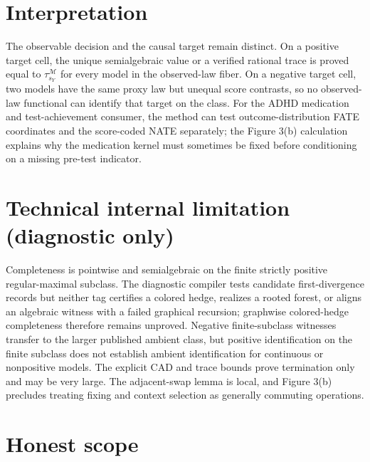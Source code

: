 \documentclass{article}
\begin{document}
\section{Interpretation}

The observable decision and the causal target remain distinct. On a positive target cell, the unique semialgebraic value or a verified rational trace is proved equal to \(\tau_{s_Y}^{\mathcal M}\) for every model in the observed-law fiber. On a negative target cell, two models have the same proxy law but unequal score contrasts, so no observed-law functional can identify that target on the class. For the ADHD medication and test-achievement consumer, the method can test outcome-distribution FATE coordinates and the score-coded NATE separately; the Figure 3(b) calculation explains why the medication kernel must sometimes be fixed before conditioning on a missing pre-test indicator.

\section*{Technical internal limitation (diagnostic only)}

Completeness is pointwise and semialgebraic on the finite strictly positive regular-maximal subclass. The diagnostic compiler tests candidate first-divergence records but neither tag certifies a colored hedge, realizes a rooted forest, or aligns an algebraic witness with a failed graphical recursion; graphwise colored-hedge completeness therefore remains unproved. Negative finite-subclass witnesses transfer to the larger published ambient class, but positive identification on the finite subclass does not establish ambient identification for continuous or nonpositive models. The explicit CAD and trace bounds prove termination only and may be very large. The adjacent-swap lemma is local, and Figure 3(b) precludes treating fixing and context selection as generally commuting operations.

\section{Honest scope}
\end{document}
